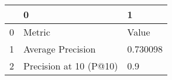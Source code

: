 \begin{tabular}{lll}
\toprule
{} &                       0 &         1 \\
\midrule
0 &                  Metric &     Value \\
1 &       Average Precision &  0.730098 \\
2 &  Precision at 10 (P@10) &       0.9 \\
\bottomrule
\end{tabular}
